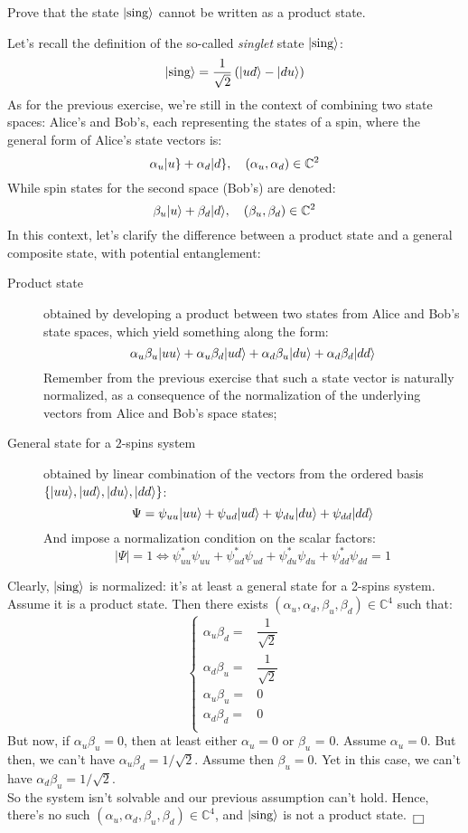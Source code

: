 \documentclass[solutions.tex]{subfiles}
\begin{document}
\maketitle
\begin{exercise} Prove that the state $\ket{\text{sing}}$ cannot
be written as a product state.
\end{exercise}
Let's recall the definition of the so-called \textit{singlet} state
$\ket{\text{sing}}$:
\[
	\ket{\text{sing}} = \frac1{\sqrt2}\left(\ket{ud}-\ket{du}\right)
\]
As for the previous exercise, we're still in the context of combining
two state spaces: Alice's and Bob's, each representing the states of a
spin, where the general form of Alice's state vectors is:
\[
	\alpha_u\keit{u} + \alpha_d\keit{d},\quad (\alpha_u, \alpha_d)\in\mathbb{C}^2
\]
While spin states for the second space (Bob's) are denoted:
\[
	\beta_u\ket{u} + \beta_d\ket{d},\quad (\beta_u, \beta_d)\in\mathbb{C}^2
\]
In this context, let's clarify the difference between a product state and a
general composite state, with potential entanglement:
\begin{description}
	\item[Product state] obtained by developing a product between
	two states from Alice and Bob's state spaces, which yield something
	along the form:
	\[
		\alpha_u\beta_u\ket{uu}+\alpha_u\beta_d\ket{ud}
			+\alpha_d\beta_u\ket{du}+\alpha_d\beta_d\ket{dd}
	\]
	Remember from the previous exercise that such a state vector
	is naturally normalized, as a consequence of the normalization
	of the underlying vectors from Alice and Bob's space states;
	\item[General state for a $2$-spins system] obtained by linear
	combination of the vectors from the ordered basis
	$\{\ket{uu}, \ket{ud}, \ket{du}, \ket{dd}\}$:
	\[
		\Psi = \psi_{uu}\ket{uu} + \psi_{ud}\ket{ud}
			+ \psi_{du}\ket{du} + \psi_{dd}\ket{dd}
	\]
	And impose a normalization condition on the scalar factors:
	\[
		|\Psi| = 1 \Leftrightarrow \psi_{uu}^*\psi_{uu}
			+ \psi_{ud}^*\psi_{ud} + \psi_{du}^*\psi_{du}
			+ \psi_{dd}^*\psi_{dd} = 1
	\]
\end{description}
Clearly, $\ket{\text{sing}}$ is normalized: it's at least a
general state for a 2-spins system. Assume it is a product state.
Then there exists $(\alpha_u, \alpha_d, \beta_u, \beta_d)\in\mathbb{C}^4$
such that:
\[
	\begin{cases}
		\alpha_u\beta_d =& \dfrac1{\sqrt2} \\
		\alpha_d\beta_u =& \dfrac1{\sqrt2} \\
		\alpha_u\beta_u =& 0 \\
		\alpha_d\beta_d =& 0 \\
	\end{cases}
\]
But now, if $\alpha_u\beta_u = 0$, then at least either $\alpha_u = 0$ or
$\beta_u$ = 0. Assume $\alpha_u = 0$. But then, we can't have $\alpha_u\beta_d = 1/\sqrt2$.
Assume then $\beta_u = 0$. Yet in this case, we can't have $\alpha_d\beta_u = 1/\sqrt2$. \\

So the system isn't solvable and our previous assumption can't hold. Hence,
there's no such $(\alpha_u, \alpha_d, \beta_u, \beta_d)\in\mathbb{C}^4$, and
$\ket{\text{sing}}$ is not a product state. $\qed$
\end{document}
